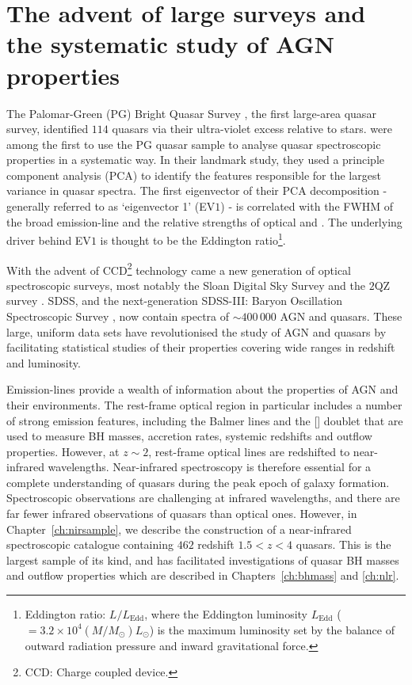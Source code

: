 \section[Large quasar surveys]{The advent of large surveys and the systematic study of AGN properties}

The Palomar-Green (PG) Bright Quasar Survey \citep[BQS;][]{schmidt83}, the first large-area quasar survey, identified $114$ quasars via their ultra-violet excess relative to stars. 
\citet{boroson92} were among the first to use the PG quasar sample to analyse quasar spectroscopic properties in a systematic way. 
In their landmark study, they used a principle component analysis (PCA) to identify the features responsible for the largest variance in quasar spectra. 
The first eigenvector of their PCA decomposition - generally referred to as `eigenvector 1' (EV$1$) - is correlated with the FWHM of the broad \hb emission-line and the relative strengths of optical  and \hbns. 
The underlying driver behind EV$1$ is thought to be the Eddington ratio\footnote{Eddington ratio: $L/L_{\text{Edd}}$, where the Eddington luminosity $L_{\text{Edd}}$ ($=3.2\times10^4(M/M_\odot)L_\odot$) is the maximum luminosity set by the balance of outward radiation pressure and inward gravitational force.}. 

With the advent of CCD\footnote{CCD: Charge coupled device.} technology came a new generation of optical spectroscopic surveys, most notably the Sloan Digital Sky Survey \citep[SDSS;][]{york00} and the $2$QZ survey \citep{croom04}. 
SDSS, and the next-generation SDSS-III: Baryon Oscillation Spectroscopic Survey \citep[BOSS;][]{dawson13}, now contain spectra of $\sim400\,000$ AGN and quasars. 
These large, uniform data sets have revolutionised the study of AGN and quasars by facilitating statistical studies of their properties covering wide ranges in redshift and luminosity.

Emission-lines provide a wealth of information about the properties of AGN and their environments. 
The rest-frame optical region in particular includes a number of strong emission features, including the Balmer lines and the [] doublet that are used to measure BH masses, accretion rates, systemic redshifts and outflow properties. 
However, at $z\sim2$, rest-frame optical lines are redshifted to near-infrared wavelengths. 
Near-infrared spectroscopy is therefore essential for a complete understanding of quasars during the peak epoch of galaxy formation. 
Spectroscopic observations are challenging at infrared wavelengths, and there are far fewer infrared observations of quasars than optical ones. 
However, in Chapter~\ref{ch:nirsample}, we describe the construction of a near-infrared spectroscopic catalogue containing $462$ redshift $1.5 < z < 4$ quasars. 
This is the largest sample of its kind, and has facilitated investigations of quasar BH masses and outflow properties which are described in Chapters~\ref{ch:bhmass} and \ref{ch:nlr}.   


